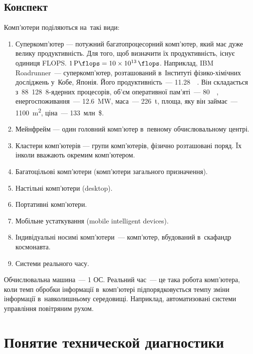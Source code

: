 \documentclass[
	a4paper,
	oneside,
	DIV = 14,
	fontsize = 14pt,
	headings = normal,
]{scrartcl}
\begin{document}
		\subsection{Конспект}
			Комп'ютери поділяються на~такі види:
			\begin{enumerate}
				\item Суперкомп'ютер — потужний багатопроцесорний комп'ютер, який має дуже велику продуктивність. Для того, щоб визначити їх продуктивність, існує одиниця \textenglish{FLOPS}. $\SI{1}{\peta\flops} = \SI{10e13}{\flops}$. Наприклад, \textenglish{IBM Roadrunner}~— суперкомп'ютер, розташований в~Інституті фізико-хімічних досліджень у~Кобе, Японія. Його продуктивність~— \SI{11.28}{\peta\flops}. Він складається з~\si{88 128}~8-ядерних процесорів, об'єм оперативної пам'яті~— \SI{80}{\tera\byte}, енергоспоживання~— \SI{12.6}{\mega\watt}, маса~— \SI{226}{\tonne}, площа, яку він займає~— \SI{1100}{\metre\squared}, ціна~— 133~млн~\$.

				\item Мейнфрейм — один головний комп'ютер в~певному обчислювальному центрі.

				\item Кластери комп'ютерів — групи комп'ютерів, фізично розташовані поряд. Їх інколи вважають окремим комп'ютером.

				\item Багатоцільові комп'ютери (комп'ютери загального призначення).

				\item Настільні комп'ютери (\textenglish{desktop}).

				\item Портативні комп'ютери.

				\item Мобільне устаткування (\textenglish{mobile intelligent devices}).

				\item Індивідуальні носимі комп'ютери~— комп'ютер, вбудований в~скафандр космонавта.

				\item Системи реального часу.
			\end{enumerate}

			Обчислювальна машина~— 1 ОС. Реальний час~— це така робота комп'ютера, коли темп обробки інформації в~комп'ютері підпорядковується темпу зміни інформації в~навколишньому середовищі. Наприклад, автоматизовані системи управління повітряним рухом. 

	\section{Понятие технической диагностики}
\end{document}
